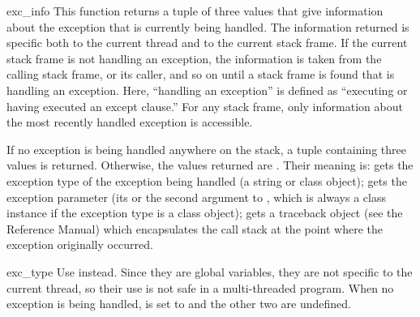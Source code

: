\begin{funcdesc}{exc_info}{}
  This function returns a tuple of three values that give information
  about the exception that is currently being handled.  The
  information returned is specific both to the current thread and to
  the current stack frame.  If the current stack frame is not handling
  an exception, the information is taken from the calling stack frame,
  or its caller, and so on until a stack frame is found that is
  handling an exception.  Here, ``handling an exception'' is defined
  as ``executing or having executed an except clause.''  For any stack
  frame, only information about the most recently handled exception is
  accessible.

  If no exception is being handled anywhere on the stack, a tuple
  containing three  values is returned.  Otherwise, the
  values returned are .  Their meaning is:  gets the exception
  type of the exception being handled (a string or class object);
   gets the exception parameter (its 
  or the second argument to , which is always a class
  instance if the exception type is a class object); 
  gets a traceback object (see the Reference Manual) which
  encapsulates the call stack at the point where the exception
  originally occurred.  

   
\end{funcdesc}

\begin{datadesc}{exc_type}
            {Use  instead.}
  Since they are global variables, they are not specific to the
  current thread, so their use is not safe in a multi-threaded
  program.  When no exception is being handled,  is set
  to  and the other two are undefined.
\end{datadesc}

